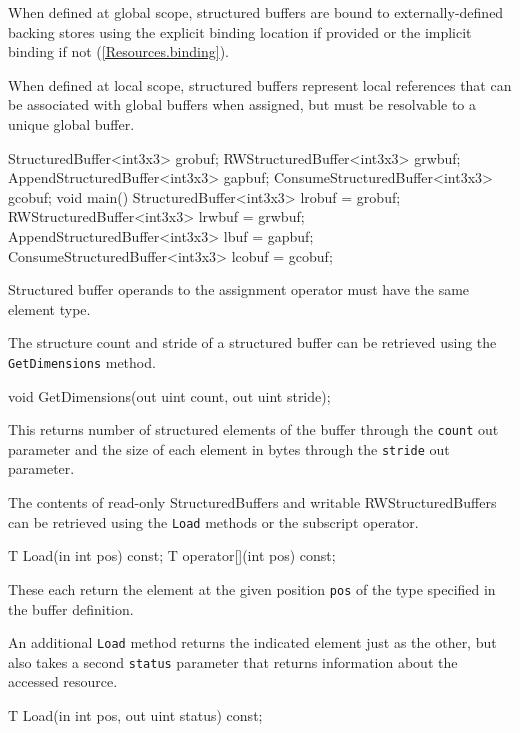 When defined at global scope, structured buffers are bound to externally-defined backing stores
using the explicit binding location if provided or the implicit binding if not (\ref{Resources.binding}).

When defined at local scope, structured buffers represent local references
that can be associated with global buffers when assigned,
but must be resolvable to a unique global buffer.

\begin{HLSL}
  StructuredBuffer<int3x3> grobuf;
  RWStructuredBuffer<int3x3> grwbuf;
  AppendStructuredBuffer<int3x3> gapbuf;
  ConsumeStructuredBuffer<int3x3> gcobuf;
  void main() {
    StructuredBuffer<int3x3> lrobuf = grobuf;
    RWStructuredBuffer<int3x3> lrwbuf = grwbuf;
    AppendStructuredBuffer<int3x3> lbuf = gapbuf;
    ConsumeStructuredBuffer<int3x3> lcobuf = gcobuf;
  }
\end{HLSL}
Structured buffer operands to the assignment operator must have the same element type.


The structure count and stride of a structured buffer can be retrieved using the \texttt{GetDimensions} method.
\begin{HLSL}
void GetDimensions(out uint count, out uint stride);
\end{HLSL}

This returns number of structured elements of the buffer through the \texttt{count} out parameter
and the size of each element in bytes through the \texttt{stride} out parameter.


The contents of read-only StructuredBuffers and writable RWStructuredBuffers can be retrieved
using the \texttt{Load} methods or the subscript operator.

\begin{HLSL}
 T Load(in int pos) const;
 T operator[](int pos) const;
\end{HLSL}

These each return the element at the given position \texttt{pos} of the type specified in the buffer definition.

An additional \texttt{Load} method returns the indicated element just as the other,
but also takes a second \texttt{status} parameter that returns information about the accessed resource.
\begin{HLSL}
 T Load(in int pos, out uint status) const;
\end{HLSL}


